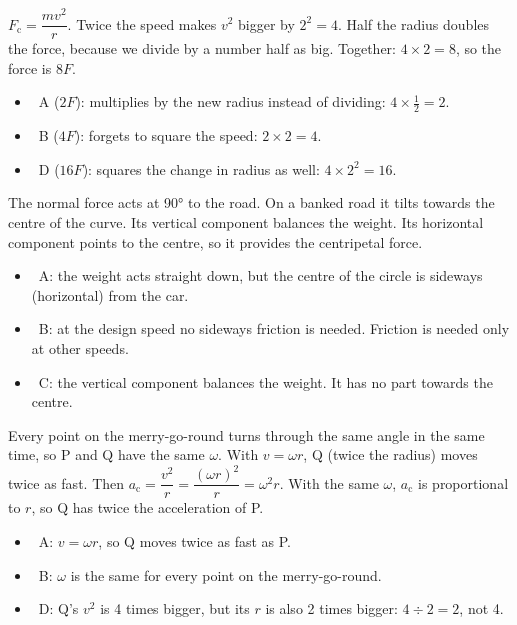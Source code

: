 \begin{practiceanswers}
\begin{practiceans}
  $F_\mathrm{c} = \dfrac{mv^2}{r}$. Twice the speed makes $v^2$ bigger by $2^2 = 4$. Half
  the radius doubles the force, because we divide by a number half as big. Together:
  $4 \times 2 = 8$, so the force is $8F$.
  \begin{itemize}
    \item \xmark\ A ($2F$): multiplies by the new radius instead of dividing:
          $4 \times \tfrac{1}{2} = 2$.
    \item \xmark\ B ($4F$): forgets to square the speed: $2 \times 2 = 4$.
    \item \xmark\ D ($16F$): squares the change in radius as well: $4 \times 2^2 = 16$.
  \end{itemize}
\end{practiceans}

\begin{practiceans}
  The normal force acts at \ang{90} to the road. On a banked road it tilts towards the centre
  of the curve. Its vertical component balances the weight. Its horizontal component points
  to the centre, so it provides the centripetal force.
  \begin{itemize}
    \item \xmark\ A: the weight acts straight down, but the centre of the circle is
          sideways (horizontal) from the car.
    \item \xmark\ B: at the design speed no sideways friction is needed. Friction is needed
          only at other speeds.
    \item \xmark\ C: the vertical component balances the weight. It has no part towards the
          centre.
  \end{itemize}
\end{practiceans}

\begin{practiceans}
  Every point on the merry-go-round turns through the same angle in the same time, so P and Q
  have the same $\omega$. With $v = \omega r$, Q (twice the radius) moves twice as fast.
  Then $a_\mathrm{c} = \dfrac{v^2}{r} = \dfrac{(\omega r)^2}{r} = \omega^2 r$. With the same
  $\omega$, $a_\mathrm{c}$ is proportional to $r$, so Q has twice the acceleration of P.
  \begin{itemize}
    \item \xmark\ A: $v = \omega r$, so Q moves twice as fast as P.
    \item \xmark\ B: $\omega$ is the same for every point on the merry-go-round.
    \item \xmark\ D: Q's $v^2$ is 4 times bigger, but its $r$ is also 2 times bigger:
          $4 \div 2 = 2$, not 4.
  \end{itemize}
\end{practiceans}


\end{practiceanswers}
